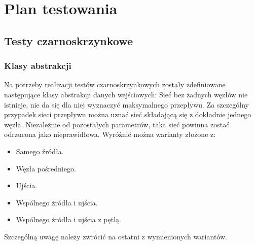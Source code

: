 \documentclass[10pt]{dokument-tiwo}
\begin{document}
\MakeDokumentMeta


\section{Plan testowania}
\subsection{Testy czarnoskrzynkowe}
\subsubsection{Klasy abstrakcji}
Na potrzeby realizacji testów czarnoskrzynkowych zostały zdefiniowane następujące klasy abstrakcji danych wejściowych:
Sieć bez żadnych węzłów nie istnieje, nie da się dla niej wyznaczyć maksymalnego przepływu.
Za szczególny przypadek sieci przepływu można uznać sieć składającą się z dokładnie jednego węzła. Niezależnie od pozostałych parametrów, taka sieć powinna zostać odrzucona jako nieprawidłowa. Wyróżnić można warianty złożone z:
\begin{itemize}
    \item Samego źródła.
    \item Węzła pośredniego.
    \item Ujścia.
    \item Wspólnego źródła i ujścia.
    \item Wspólnego źródła i ujścia z pętlą.
\end{itemize}
Szczególną uwagę należy zwrócić na ostatni z wymienionych wariantów.
\end{document}
